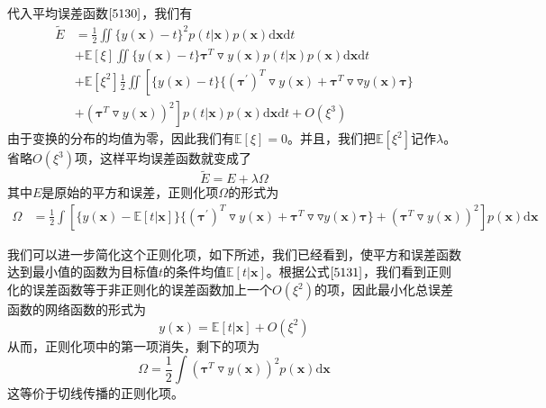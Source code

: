 代入平均误差函数$\ref{5130}$，我们有
\begin{equation}
	\begin{aligned}
		\tilde{E}&=\frac{1}{2}\iint \{y(\boldsymbol{x})-t \}^2p(t|\boldsymbol{x})p(\boldsymbol{x})\mathrm{d}\boldsymbol{x}\mathrm{d}t\\
		&+\mathbb{E}[\xi]\iint \{y(\boldsymbol{x})-t \}\boldsymbol{\tau}^T\triangledown y(\boldsymbol{x})p(t|\boldsymbol{x})p(\boldsymbol{x})\mathrm{d}\boldsymbol{x}\mathrm{d}t\\
		&+\mathbb{E}[\xi^2]\frac{1}{2}\iint \left[\{y(\boldsymbol{x})-t \}\{(\boldsymbol{\tau}^{'})^T\triangledown y(\boldsymbol{x})+\boldsymbol{\tau}^T\triangledown\triangledown y(\boldsymbol{x})\boldsymbol{\tau} \} \right.\\
		&\left.+(\boldsymbol{\tau}^T\triangledown y(\boldsymbol{x}))^2\right]p(t|\boldsymbol{x})p(\boldsymbol{x})\mathrm{d}\boldsymbol{x}\mathrm{d}t +O(\xi^3)
	\end{aligned}
\end{equation}
由于变换的分布的均值为零，因此我们有$\mathbb{E}[\xi]=0$。并且，我们把$\mathbb{E}[\xi^2]$记作$\lambda$。省略$O(\xi^3)$项，这样平均误差函数就变成了
\begin{equation}
\label{5131}
	\tilde{E}=E+\lambda\Omega
\end{equation}
其中$E$是原始的平方和误差，正则化项$\Omega$的形式为
\begin{equation}
	\begin{aligned}
		\Omega&=\frac{1}{2}\int \left[\{y(\boldsymbol{x})-\mathbb{E}[t|\boldsymbol{x}] \}\{(\boldsymbol{\tau}^{'})^T\triangledown y(\boldsymbol{x})+\boldsymbol{\tau}^T\triangledown\triangledown y(\boldsymbol{x})\boldsymbol{\tau} \}+(\boldsymbol{\tau}^T\triangledown y(\boldsymbol{x}))^2 \right]p(\boldsymbol{x})\mathrm{d}\boldsymbol{x}
	\end{aligned}
\end{equation}

我们可以进一步简化这个正则化项，如下所述，我们已经看到，使平方和误差函数达到最小值的函数为目标值$t$的条件均值$\mathbb{E}[t|\boldsymbol{x}]$。根据公式$\ref{5131}$，我们看到正则化的误差函数等于非正则化的误差函数加上一个$O(\xi^2)$的项，因此最小化总误差函数的网络函数的形式为
\begin{equation}
	y(\boldsymbol{x})=\mathbb{E}[t|\boldsymbol{x}]+O(\xi^2)
\end{equation}
从而，正则化项中的第一项消失，剩下的项为
\begin{equation}
	\Omega=\frac{1}{2}\int (\boldsymbol{\tau}^T\triangledown y(\boldsymbol{x}))^2p(\boldsymbol{x})\mathrm{d}\boldsymbol{x}
\end{equation}
这等价于切线传播的正则化项。

